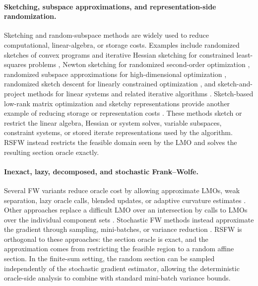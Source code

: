 \documentclass{article}
\begin{document}
\paragraph{Sketching, subspace approximations, and representation-side randomization.}
Sketching and random-subspace methods are widely used to reduce computational,
linear-algebra, or storage costs. Examples include randomized sketches of convex
programs and iterative Hessian sketching for constrained least-squares problems
\cite{PilanciWainwright2015SharpSketches,PilanciWainwright2016IterativeHessianSketch},
Newton sketching for randomized second-order optimization
\cite{PilanciWainwright2017NewtonSketch}, randomized subspace approximations
for high-dimensional optimization
\cite{LacottePilanciPavone2019AdaptiveRandomSubspaces,LacottePilanci2022RandomizedSubspaceMethods},
randomized sketch descent for linearly constrained optimization
\cite{NecoaraTakac2021RandomSketchDescent}, and sketch-and-project methods for
linear systems and related iterative algorithms
\cite{GowerRichtarik2015SketchAndProject,DerezinskiRebrova2024SharpSketchProject}.
Sketch-based low-rank matrix optimization and sketchy representations provide
another example of reducing storage or representation costs
\cite{YurtseverUdellTroppCevher2017Sketchy}. These methods sketch or restrict
the linear algebra, Hessian or system solves, variable subspaces, constraint
systems, or stored iterate representations used by the algorithm. RSFW instead
restricts the feasible domain seen by the LMO and solves the resulting section
oracle exactly.

\paragraph{Inexact, lazy, decomposed, and stochastic Frank--Wolfe.}
Several FW variants reduce oracle cost by allowing approximate LMOs, weak
separation, lazy oracle calls, blended updates, or adaptive curvature estimates
\cite{BraunPokuttaZink2017Lazifying,BraunPokuttaTuWright2019Blended,PedregosaNegiarAskariJaggi2020Backtracking,ZhouSun2022ApproximateFW}.
Other approaches replace a difficult LMO over an intersection by calls to LMOs
over the individual component sets \cite{WoodstockPokutta2025SplittingCG}.
Stochastic FW methods instead approximate the gradient through sampling,
mini-batches, or variance reduction
\cite{HazanKale2012ProjectionFreeOnline,HazanLuo2016VRPF,LocatelloYurtseverFercoqCevher2019SFW,NegiarDresdnerTsaiElGhaouiLocatelloFreundPedregosa2020SFW,DresdnerVladareanRatschLocatelloCevherYurtsever2022OneSample}.
RSFW is orthogonal to these approaches: the section oracle is exact, and the
approximation comes from restricting the feasible region to a random affine
section. In the finite-sum setting, the random section can be sampled
independently of the stochastic gradient estimator, allowing the deterministic
oracle-side analysis to combine with standard mini-batch variance bounds.
\end{document}

